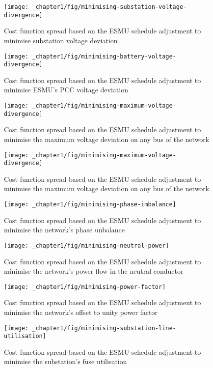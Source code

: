 \begin{figure}\centering
	\texttt{[image: \_chapter1/fig/minimising-substation-voltage-divergence]}
	\caption{Cost function spread based on the ESMU schedule adjustment to minimise substation voltage deviation}
\end{figure}

\begin{figure}\centering
	\texttt{[image: \_chapter1/fig/minimising-battery-voltage-divergence]}
	\caption{Cost function spread based on the ESMU schedule adjustment to minimise ESMU's PCC voltage deviation}
\end{figure}

\begin{figure}\centering
	\texttt{[image: \_chapter1/fig/minimising-maximum-voltage-divergence]}
	\caption{Cost function spread based on the ESMU schedule adjustment to minimise the maximum voltage deviation on any bus of the network}
\end{figure}

\begin{figure}\centering
	\texttt{[image: \_chapter1/fig/minimising-maximum-voltage-divergence]}
	\caption{Cost function spread based on the ESMU schedule adjustment to minimise the maximum voltage deviation on any bus of the network}
\end{figure}

\begin{figure}\centering
	\texttt{[image: \_chapter1/fig/minimising-phase-imbalance]}
	\caption{Cost function spread based on the ESMU schedule adjustment to minimise the network's phase unbalance}
\end{figure}

\begin{figure}\centering
	\texttt{[image: \_chapter1/fig/minimising-neutral-power]}
	\caption{Cost function spread based on the ESMU schedule adjustment to minimise the network's power flow in the neutral conductor}
\end{figure}

\begin{figure}\centering
	\texttt{[image: \_chapter1/fig/minimising-power-factor]}
	\caption{Cost function spread based on the ESMU schedule adjustment to minimise the network's offset to unity power factor}
\end{figure}

\begin{figure}\centering
	\texttt{[image: \_chapter1/fig/minimising-substation-line-utilisation]}
	\caption{Cost function spread based on the ESMU schedule adjustment to minimise the substation's fuse utilisation}
\end{figure}

